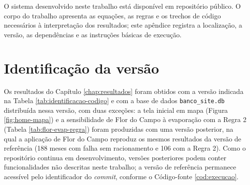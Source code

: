 \label{ap:codigo-fonte}

O sistema desenvolvido neste trabalho está disponível em repositório público. O corpo do trabalho apresenta as equações, as regras e os trechos de código necessários à interpretação dos resultados; este apêndice registra a localização, a versão, as dependências e as instruções básicas de execução.

\section{Identificação da versão}

\begin{table}[!htbp]
    \captionsetup{width=15cm}
\end{table}

Os resultados do Capítulo \ref{chap:resultados} foram obtidos com a versão indicada na Tabela \ref{tab:identificacao-codigo} e com a base de dados \texttt{banco\_site.db} distribuída nessa versão, com duas exceções: a tela inicial em mapa (Figura \ref{fig:home-mapa}) e a sensibilidade de Flor do Campo à evaporação com a Regra 2 (Tabela \ref{tab:flor-evap-regra}) foram produzidas com uma versão posterior, na qual a aplicação de Flor do Campo reproduz os mesmos resultados da versão de referência (188 meses com falha sem racionamento e 106 com a Regra 2). Como o repositório continua em desenvolvimento, versões posteriores podem conter funcionalidades não descritas neste trabalho; a versão de referência permanece acessível pelo identificador do \textit{commit}, conforme o Código-fonte \ref{cod:execucao}.

